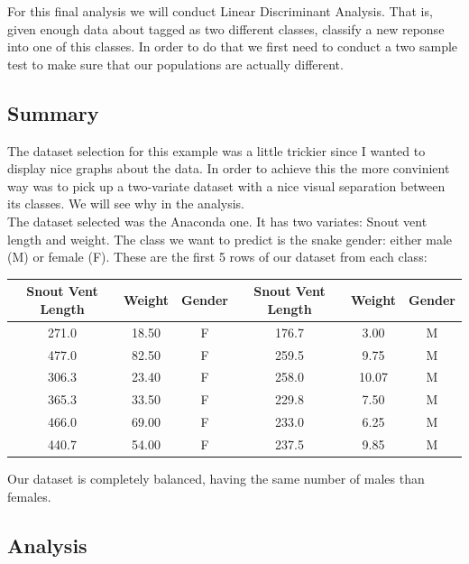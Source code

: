 \documentclass[11pt,a4paper]{article}
\begin{document}
	For this final analysis we will conduct Linear Discriminant Analysis. That is, given enough data about tagged as two different classes, classify a new reponse into one of this classes. In order to do that we first need to conduct a two sample test to make sure that our populations are actually different.
	
	\subsection{Summary}
	
	The dataset selection for this example was a little trickier since I wanted to display nice graphs about the data. In order to achieve this the more convinient way was to pick up a two-variate dataset with a nice visual separation between its classes. We will see why in the analysis. \\
	
	The dataset selected was the Anaconda one. It has two variates: Snout vent length and weight. The class we want to predict is the snake gender: either male (M) or female (F). These are the first 5 rows of our dataset from each class:
	
	\begin{table}[H] \centering
		\begin{tabular}{|ccc|ccc|}
			\hline
			Snout Vent Length & Weight & Gender & Snout Vent Length & Weight & Gender \\ \hline
			271.0             & 18.50  & F      & 176.7             & 3.00   & M      \\
			477.0             & 82.50  & F      & 259.5             & 9.75   & M      \\
			306.3             & 23.40  & F      & 258.0             & 10.07  & M      \\
			365.3             & 33.50  & F      & 229.8             & 7.50   & M      \\
			466.0             & 69.00  & F      & 233.0             & 6.25   & M      \\
			440.7             & 54.00  & F      & 237.5             & 9.85   & M      \\ \hline
		\end{tabular}
	\end{table}
	
	Our dataset is completely balanced, having the same number of males than females.
	
	\subsection{Analysis}
	
\end{document}
